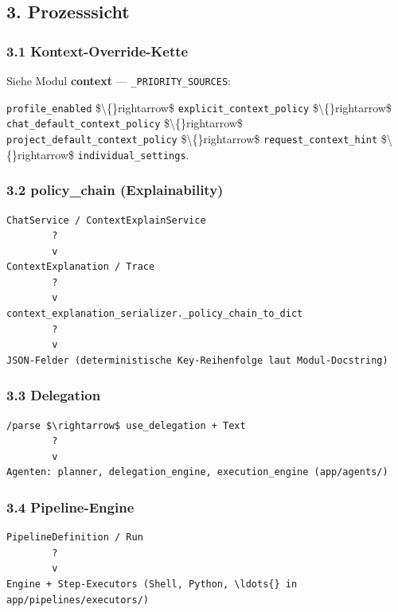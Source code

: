 \subsection{3. Prozesssicht}

\subsubsection{3.1 Kontext-Override-Kette}

Siehe Modul \textbf{context} --- \texttt{\_PRIORITY\_SOURCES}:

\texttt{profile\_enabled} \$\textbackslash\{\}rightarrow\$ \texttt{explicit\_context\_policy} \$\textbackslash\{\}rightarrow\$ \texttt{chat\_default\_context\_policy} \$\textbackslash\{\}rightarrow\$ \texttt{project\_default\_context\_policy} \$\textbackslash\{\}rightarrow\$ \texttt{request\_context\_hint} \$\textbackslash\{\}rightarrow\$ \texttt{individual\_settings}.

\subsubsection{3.2 policy\_chain (Explainability)}

\begin{verbatim}
ChatService / ContextExplainService
        ?
        v
ContextExplanation / Trace
        ?
        v
context_explanation_serializer._policy_chain_to_dict
        ?
        v
JSON-Felder (deterministische Key-Reihenfolge laut Modul-Docstring)
\end{verbatim}

\subsubsection{3.3 Delegation}

\begin{verbatim}
/parse $\rightarrow$ use_delegation + Text
        ?
        v
Agenten: planner, delegation_engine, execution_engine (app/agents/)
\end{verbatim}

\subsubsection{3.4 Pipeline-Engine}

\begin{verbatim}
PipelineDefinition / Run
        ?
        v
Engine + Step-Executors (Shell, Python, \ldots{} in app/pipelines/executors/)
\end{verbatim}

